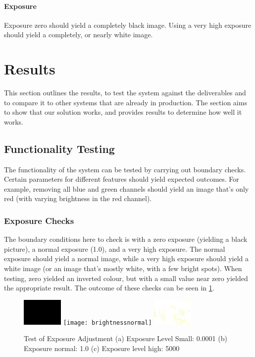 \documentclass[10pt,a4paper]{article}
\begin{document}
\paragraph{Exposure}
Exposure zero should yield a completely black image. Using a very high exposure should yield a completely, or nearly white image.

\section{Results}
This section outlines the results, to test the system against the deliverables and to compare it to other systems that are already in production.
The section aims to show that our solution works, and provides results to determine how well it works.

\subsection{Functionality Testing}
The functionality of the system can be tested by carrying out boundary checks. Certain parameters for different features should yield 
expected outcomes. For example, removing all blue and green channels should yield an image that's only red (with varying brightness in the red channel).

\subsubsection{Exposure Checks}
The boundary conditions here to check is with a zero exposure (yielding a black picture), a normal exposure (1.0), and a very high exposure.
The normal exposure should yield a normal image, while a very high exposure should yield a white image (or an image that's mostly white, with a few
bright spots). When testing, zero yielded an inverted colour, but with a small value near zero yielded the appropriate result. The outcome of these
checks can be seen in \ref{exposuretest}.


\begin{figure}
    \centering
    \subfigure
    {
        \includegraphics[width=75px]{brightnesspoint0001}
    }
    \subfigure
    {
        \texttt{[image: brightnessnormal]}
    }
    \subfigure
    {
        \includegraphics[width=75px]{brightness5000}
    }
    \caption{
        Test of Exposure Adjustment 
        (a) Exposure Level Small: 0.0001
        (b) Exposure normal: 1.0
        (c) Exposure level high: 5000
    }
    \label{exposuretest}
 \end{figure}
\end{document}
